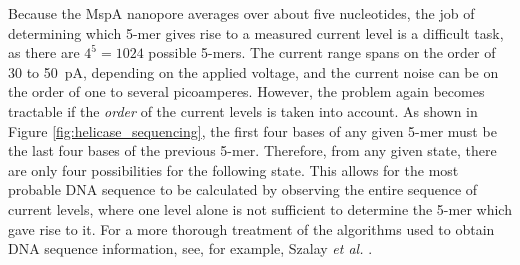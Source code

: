 Because the MspA nanopore averages over about five nucleotides, the job of determining which 5-mer gives rise to a measured current level is a difficult task, as there are $4^5 = 1024$ possible 5-mers.  The current range spans on the order of \num{30} to \SI{50}{\pA}, depending on the applied voltage, and the current noise can be on the order of one to several picoamperes.  However, the problem again becomes tractable if the \textit{order} of the current levels is taken into account.  As shown in Figure \ref{fig:helicase_sequencing}, the first four bases of any given 5-mer must be the last four bases of the previous 5-mer.  Therefore, from any given state, there are only four possibilities for the following state.  This allows for the most probable DNA sequence to be calculated by observing the entire sequence of current levels, where one level alone is not sufficient to determine the 5-mer which gave rise to it.  For a more thorough treatment of the algorithms used to obtain DNA sequence information, see, for example, Szalay \textit{et al.} \citep{Szalay2015}.
